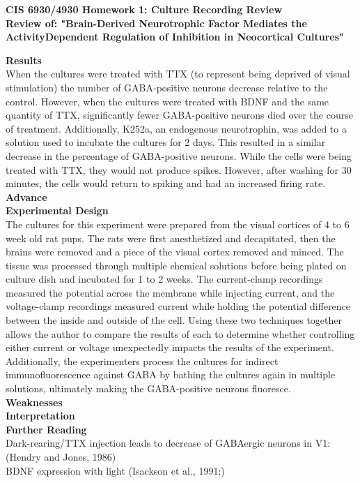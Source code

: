 \documentclass[11pt]{article}
\begin{document}
\begin{center}
{\large {\bf CIS 6930/4930 Homework 1: Culture Recording Review}}\\
{\normalsize {\bf Review of: "Brain-Derived Neurotrophic Factor Mediates the ActivityDependent
Regulation of Inhibition in Neocortical Cultures"}}
\end{center}

\textbf{Results} \\
When the cultures were treated with TTX (to represent being deprived of visual stimulation)
the number of GABA-positive neurons decrease relative to the control.  However,
when the cultures were treated with BDNF and the same quantity of TTX, significantly
fewer GABA-positive neurons died over the course of treatment.  Additionally, K252a,
an endogenous neurotrophin, was added to a solution used to incubate the cultures
for 2 days.  This resulted in a similar decrease in the percentage of GABA-positive
neurons.  While the cells were being treated with TTX, they would not produce spikes.
However, after washing for 30 minutes, the cells would return to spiking and had
an increased firing rate.  \\

\textbf{Advance} \\

\textbf{Experimental Design} \\
The cultures for this experiment were prepared from the visual cortices of 4 to 6
week old rat pups.  The rats were first anesthetized and decapitated, then the brains
were removed and a piece of the visual cortex removed and minced.  The tissue was
processed through multiple chemical solutions before being plated on culture dish
and incubated for 1 to 2 weeks.  The current-clamp recordings measured the potential
across the membrane while injecting current, and the voltage-clamp recordings measured
current while holding the potential difference between the inside and outside of
the cell.  Using these two techniques together allows the author to compare the
results of each to determine whether controlling either current or voltage unexpectedly
impacts the results of the experiment.  Additionally, the experimenters process
the cultures for indirect immunofluorescence against GABA by bathing the cultures
again in multiple solutions, ultimately making the GABA-positive neurons fluoresce. \\

\textbf{Weaknesses} \\

\textbf{Interpretation} \\

\textbf{Further Reading} \\
Dark-rearing/TTX injection leads to decrease of GABAergic neurons in V1: (Hendry
and Jones, 1986) \\
BDNF expression with light (Isackson et al., 1991;) \\
\end{document}
